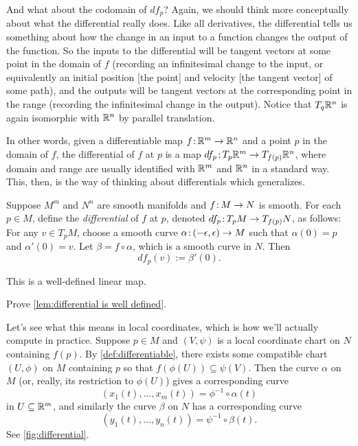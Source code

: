 And what about the codomain of $df_p$? Again, we should think more conceptually about what the differential really does. Like all derivatives, the differential tells us something about how the change in an input to a function changes the output of the function. So the inputs to the differential will be tangent vectors at some point in the domain of $f$ (recording an infinitesimal change to the input, or equivalently an initial position [the point] and velocity [the tangent vector] of some path), and the outputs will be tangent vectors at the corresponding point in the range (recording the infinitesimal change in the output). Notice that $T_q \mathbb{R}^n$ is again isomorphic with $\mathbb{R}^n$ by parallel translation.

In other words, given a differentiable map $f \colon\thinspace\!\! \mathbb{R}^m \to \mathbb{R}^n$ and a point $p$ in the domain of $f$, the differential of $f$ at $p$ is a map $df_p \colon\thinspace\!\! T_p \mathbb{R}^m \to T_{f(p)}\mathbb{R}^n$, where domain and range are usually identified with $\mathbb{R}^m$ and $\mathbb{R}^n$ in a standard way. This, then, is the way of thinking about differentials which generalizes.

\begin{definition}\label{def:differential}
	Suppose $M^m$ and $N^n$ are smooth manifolds and $f \colon\thinspace\!\! M \to N$ is smooth. For each $p \in M$, define the \emph{differential} of $f$ at $p$, denoted $df_p\colon\thinspace\!\! T_p M \to T_{f(p)}N$, as follows: For any $v \in T_p M$, choose a smooth curve $\alpha \colon\thinspace\!\! (-\epsilon, \epsilon) \to M$ such that $\alpha(0) = p$ and $\alpha'(0) = v$. Let $\beta = f \circ \alpha$, which is a smooth curve in $N$. Then
	\[
		df_p(v) := \beta'(0).
	\]
\end{definition}

\begin{lemma}\label{lem:differential is well defined}
	This is a well-defined linear map.
\end{lemma}

\begin{exercise}
	Prove \cref{lem:differential is well defined}.
\end{exercise}

Let's see what this means in local coordinates, which is how we'll actually compute in practice. Suppose $p \in M$ and $(V, \psi)$ is a local coordinate chart on $N$ containing $f(p)$. By \cref{def:differentiable}, there exists some compatible chart $(U, \phi)$ on $M$ containing $p$ so that $f(\phi(U)) \subseteq \psi(V)$. Then the curve $\alpha$ on $M$ (or, really, its restriction to $\phi(U)$) gives a corresponding curve
\[
	(x_1(t), \dots , x_m(t)) = \phi^{-1} \circ \alpha(t)
\]
in $U \subseteq \mathbb{R}^m$, and similarly the curve $\beta$ on $N$ has a corresponding curve
\[
	(y_1(t), \dots , y_n(t)) = \psi^{-1} \circ \beta(t).
\]
See \cref{fig:differential}.


